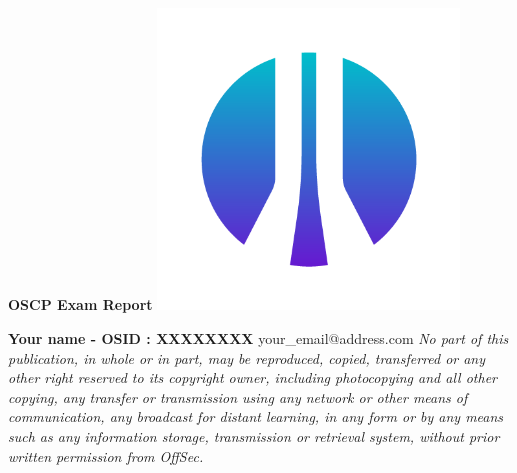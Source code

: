 \begin{titlepage}
\begin{center}
\vspace*{1cm}
\textbf{\huge OSCP Exam Report}
\includegraphics[width=0.6\textwidth]{images/offsec_logo.png}


       \textbf{ Your name - OSID : XXXXXXXX}
       \vspace*{0,5cm}
       \break
       your\_email@address.com
       \vfill
       \textit{No part of this publication, in whole or in part, may be reproduced, copied, transferred or any other right reserved to its copyright owner, including photocopying and all other copying, any transfer or transmission using any network or other means of communication, any broadcast for distant learning, in any form or by any means such as any information storage, transmission or retrieval system, without prior written permission from OffSec.}
   \end{center}
\end{titlepage}